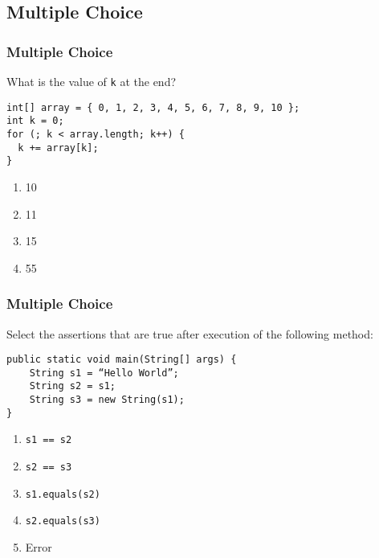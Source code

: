 \documentclass[9pt]{beamer}
\begin{document}
\subsection{Multiple Choice}
\begin{frame}[fragile]
  \frametitle{Multiple Choice}
  What is the value of {\tt k} at the end?

  \begin{lstlisting}
int[] array = { 0, 1, 2, 3, 4, 5, 6, 7, 8, 9, 10 };
int k = 0;
for (; k < array.length; k++) {
  k += array[k];
}
  \end{lstlisting}

  \begin{enumerate}
    \item
      10
    \item
      11
    \item
      \alert<2>{15}
    \item
      55
  \end{enumerate}
\end{frame}

\begin{frame}[fragile]
  \frametitle{Multiple Choice}
  Select the assertions that are true after execution of the following method:

  \begin{lstlisting}
public static void main(String[] args) {
    String s1 = “Hello World”;
    String s2 = s1;
    String s3 = new String(s1);
}
  \end{lstlisting}

  \begin{enumerate}
    \item
      \alert<2>{{\tt s1 == s2}}
    \item
      {\tt s2 == s3}
    \item
      \alert<2>{{\tt s1.equals(s2)}}
    \item
      \alert<2>{{\tt s2.equals(s3)}}
    \item
      Error
  \end{enumerate}
\end{frame}
\end{document}
